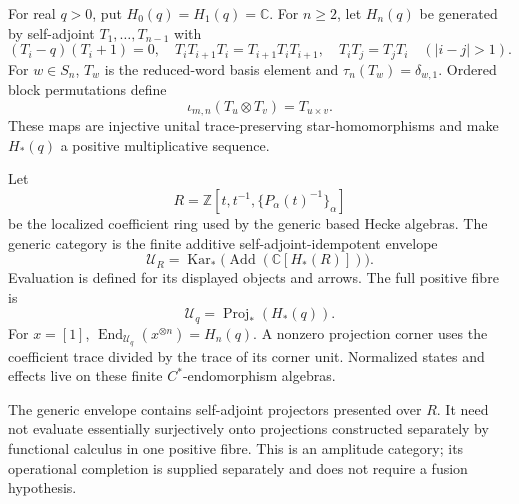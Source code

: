 \begin{definition}
For real $q>0$, put $H_0(q)=H_1(q)=\mathbb C$.  For $n\geq2$, let $H_n(q)$
be generated by self-adjoint $T_1,\ldots,T_{n-1}$ with
\[
 (T_i-q)(T_i+1)=0,
 \quad T_iT_{i+1}T_i=T_{i+1}T_iT_{i+1},
 \quad T_iT_j=T_jT_i\quad(|i-j|>1).
\]
For $w\in S_n$, $T_w$ is the reduced-word basis element and
$\tau_n(T_w)=\delta_{w,1}$.  Ordered block permutations define
\[
 \iota_{m,n}(T_u\otimes T_v)=T_{u\times v}.
\]
These maps are injective unital trace-preserving star-homomorphisms and make
$H_*(q)$ a positive multiplicative sequence.

Let
\[
 R=\mathbb Z[t,t^{-1},\{P_\alpha(t)^{-1}\}_\alpha]
\]
be the localized coefficient ring used by the generic based Hecke algebras.
The generic category is the finite additive self-adjoint-idempotent envelope
\[
 \mathcal U_R=\operatorname{Kar}_*\!\bigl(\operatorname{Add}
                 (\mathbb C[H_*(R)])\bigr).
\]
Evaluation is defined for its displayed objects and arrows.  The full
positive fibre is
\[
 \mathcal U_q=\operatorname{Proj}_*(H_*(q)).
\]
For $x=[1]$, $\operatorname{End}_{\mathcal U_q}(x^{\otimes n})=H_n(q)$.
A nonzero projection corner uses the coefficient trace divided by the trace
of its corner unit.  Normalized states and effects live on these finite
$C^*$-endomorphism algebras.
\end{definition}
\begin{scope}
The generic envelope contains self-adjoint projectors presented over $R$.
It need not evaluate essentially surjectively onto projections constructed
separately by functional calculus in one positive fibre.  This is an
amplitude category; its operational completion is supplied separately and
does not require a fusion hypothesis.
\end{scope}

